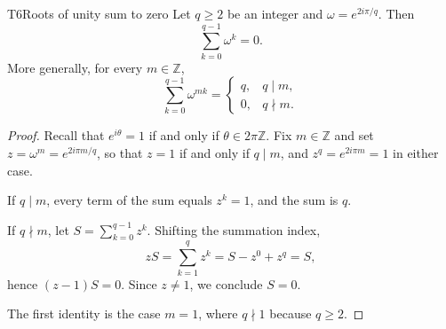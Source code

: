 \documentclass[11pt,a4paper,oneside,open=any,numbers=noenddot]{scrbook}
\begin{document}
\begin{tool}{T6}{Roots of unity sum to zero}
    Let $q\geq 2$ be an integer and $\omega=e^{2i\pi/q}$. Then
    \begin{equation}
        \sum_{k=0}^{q-1} \omega^k = 0 .
    \end{equation}
    More generally, for every $m\in\mathbb{Z}$,
    \begin{equation}
        \sum_{k=0}^{q-1} \omega^{mk} =
        \begin{cases}
            q, & q \mid m,\\
            0, & q \nmid m.
        \end{cases}
    \end{equation}

    \begin{proof}
        Recall that $e^{i\theta}=1$ if and only if $\theta\in 2\pi\mathbb{Z}$.
        Fix $m\in\mathbb{Z}$ and set $z=\omega^m=e^{2i\pi m/q}$, so that
        $z=1$ if and only if $q\mid m$, and
        $z^q=e^{2i\pi m}=1$ in either case.

        If $q\mid m$, every term of the sum equals $z^k=1$, and the sum is $q$.

        If $q\nmid m$, let $S=\sum_{k=0}^{q-1}z^k$. Shifting the summation index,
        \begin{equation*}
            zS=\sum_{k=1}^{q}z^k = S - z^0 + z^q = S ,
        \end{equation*}
        hence $(z-1)S=0$. Since $z\neq 1$, we conclude $S=0$.

        The first identity is the case $m=1$, where $q\nmid 1$ because $q\geq 2$.
    \end{proof}
\end{tool}
\end{document}
